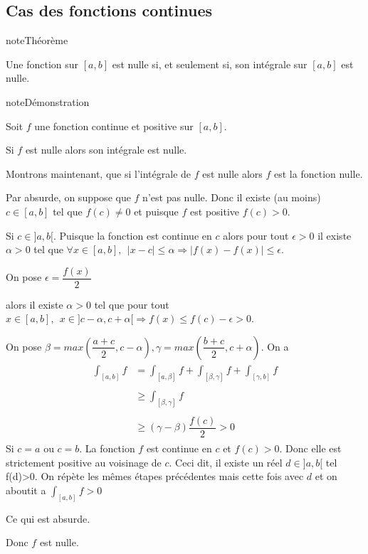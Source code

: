 \documentclass[letterpaper,10pt,french]{jupyterBook}
\begin{document}
\subsection{Cas des fonctions continues}
\label{\detokenize{pptint:cas-des-fonctions-continues}}
\begin{sphinxadmonition}{note}{Théorème}

\sphinxAtStartPar
Une fonction  sur \([a, b]\) est nulle si, et seulement si, son intégrale sur \([a, b]\) est nulle.
\end{sphinxadmonition}

\begin{sphinxadmonition}{note}{Démonstration}

\sphinxAtStartPar
Soit \(f\) une fonction continue et positive sur \([a, b]\).

\sphinxAtStartPar
Si \(f\) est nulle alors son intégrale est nulle.

\sphinxAtStartPar
Montrons maintenant, que si l’intégrale de \(f\) est nulle alors \(f\) est la fonction nulle.

\sphinxAtStartPar
Par absurde, on suppose que \(f\) n’est pas nulle. Donc il existe (au moins) \(c \in [a, b]\) tel que \(f(c) \neq 0\) et puisque \(f\) est positive \(f(c) > 0\).

\sphinxhyphen{} Si \(c \in ]a, b[\). Puisque la fonction est continue en \(c\) alors pour tout \(\epsilon >0\) il existe \(\alpha > 0\) tel que \(\forall x \in [a, b],~~ |x-c| \leq \alpha \Rightarrow |f(x) - f(x)|\leq \epsilon\).

\sphinxAtStartPar
On pose \(\epsilon = \dfrac{f(x)}{2}\)

\sphinxAtStartPar
alors il existe \(\alpha>0\) tel que pour tout \(x\in [a, b], ~~ x \in ]c-\alpha, c +\alpha[ \Rightarrow f(x)\leq f(c)-\epsilon > 0\).

\sphinxAtStartPar
On pose \(\beta = max(\dfrac{a+c}{2}, c-\alpha), \gamma = max(\dfrac{b+c}{2}, c+\alpha)\). On a
\begin{equation*}
\begin{split}
\begin{aligned}
\int_{[a, b]}f &= \int_{[a, \beta]}f + \int_{[\beta, \gamma]}f + \int_{[\gamma, b]}f \\ \\
&\geq  \int_{[\beta, \gamma]}f \\ \\
&\geq  (\gamma -\beta )\dfrac{f(c)}{2}> 0
\end{aligned}
\end{split}
\end{equation*}
\sphinxhyphen{} Si \(c =a\) ou \(c=b\). La fonction \(f\) est continue en \(c\) et \(f(c)>0\). Donc elle est strictement positive au voisinage de \(c\). Ceci dit, il existe un réel \(d \in ]a, b[\) tel f(d)>0. On répète les mêmes étapes précédentes mais cette fois avec \(d\) et on aboutit a \(\int_{[a, b]}f >0\)

\sphinxAtStartPar
Ce qui est absurde.

\sphinxAtStartPar
Donc \(f\) est nulle.
\end{sphinxadmonition}
\end{document}
